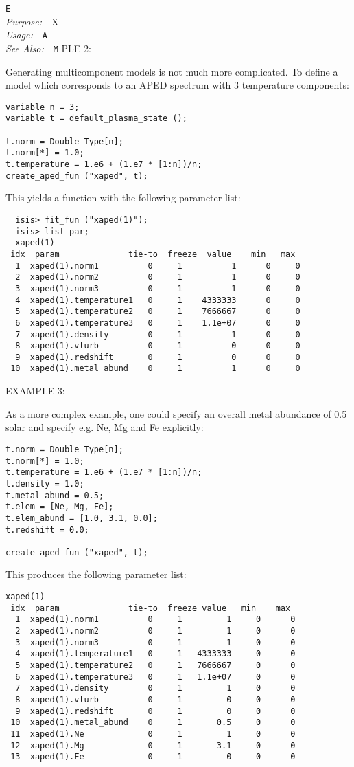 \documentclass{book}
\makeatletter
\newif\ifpdf
\newenvironment{isisfunction}[4]%
{\index{{#1}@{\tt #1}}%
  \ifpdf
  \else
     \addcontentsline{toc}{subsection}{{#1} -- {#2}}
  \fi
  \vbox{
          \vspace*{\baselineskip}
          {\LARGE\tt #1}\vspace*{\baselineskip}\\
          {{\it Purpose:}~~{#2}}\\
          {{\it Usage:}~~{\tt #3}}\\
          {{\it See Also:}~~{\tt #4}}
       }
}%
{ }
\makeatother
\begin{document}
{\begin{isisfunction}
EXAMPLE 2:

Generating multicomponent models is not much more complicated. To
define a model which corresponds to an APED spectrum with 3
temperature components:
\begin{verbatim}
variable n = 3;
variable t = default_plasma_state ();

t.norm = Double_Type[n];
t.norm[*] = 1.0;
t.temperature = 1.e6 + (1.e7 * [1:n])/n;
create_aped_fun ("xaped", t);
\end{verbatim}

This yields a function with the following parameter list:
\begin{verbatim}
  isis> fit_fun ("xaped(1)");
  isis> list_par;
  xaped(1)
 idx  param              tie-to  freeze  value    min   max
  1  xaped(1).norm1          0     1          1      0     0
  2  xaped(1).norm2          0     1          1      0     0
  3  xaped(1).norm3          0     1          1      0     0
  4  xaped(1).temperature1   0     1    4333333      0     0
  5  xaped(1).temperature2   0     1    7666667      0     0
  6  xaped(1).temperature3   0     1    1.1e+07      0     0
  7  xaped(1).density        0     1          1      0     0
  8  xaped(1).vturb          0     1          0      0     0
  9  xaped(1).redshift       0     1          0      0     0
 10  xaped(1).metal_abund    0     1          1      0     0
\end{verbatim}

EXAMPLE 3:

As a more complex example, one could specify an overall metal
abundance of 0.5 solar and specify e.g. Ne, Mg and Fe explicitly:

\begin{verbatim}
t.norm = Double_Type[n];
t.norm[*] = 1.0;
t.temperature = 1.e6 + (1.e7 * [1:n])/n;
t.density = 1.0;
t.metal_abund = 0.5;
t.elem = [Ne, Mg, Fe];
t.elem_abund = [1.0, 3.1, 0.0];
t.redshift = 0.0;

create_aped_fun ("xaped", t);
\end{verbatim}

This produces the following parameter list:
\begin{verbatim}
xaped(1)
 idx  param              tie-to  freeze value   min    max
  1  xaped(1).norm1          0     1         1     0      0
  2  xaped(1).norm2          0     1         1     0      0
  3  xaped(1).norm3          0     1         1     0      0
  4  xaped(1).temperature1   0     1   4333333     0      0
  5  xaped(1).temperature2   0     1   7666667     0      0
  6  xaped(1).temperature3   0     1   1.1e+07     0      0
  7  xaped(1).density        0     1         1     0      0
  8  xaped(1).vturb          0     1         0     0      0
  9  xaped(1).redshift       0     1         0     0      0
 10  xaped(1).metal_abund    0     1       0.5     0      0
 11  xaped(1).Ne             0     1         1     0      0
 12  xaped(1).Mg             0     1       3.1     0      0
 13  xaped(1).Fe             0     1         0     0      0
\end{verbatim}


\end{isisfunction}}
\end{document}
